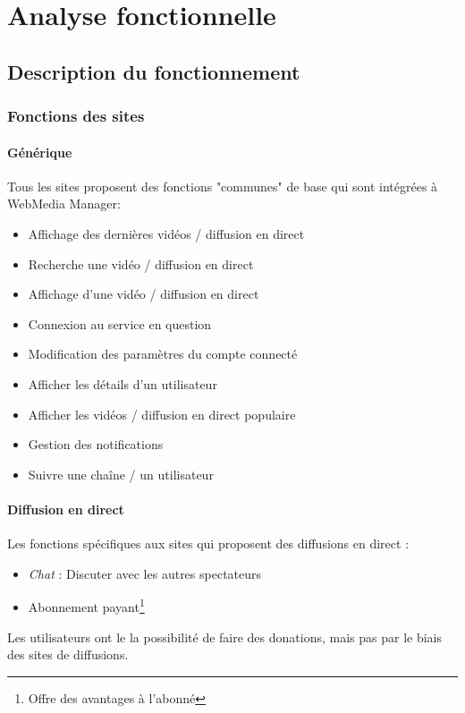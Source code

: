 \documentclass[11pt]{report} %
\begin{document}
		
\chapter{Analyse fonctionnelle}
	\section{Description du fonctionnement}
		\subsection{Fonctions des sites}
			\subsubsection{Générique}
			Tous les sites proposent des fonctions "communes" de base qui sont intégrées à WebMedia Manager:
			\begin{itemize}
				\item Affichage des dernières vidéos / diffusion en direct
				\item Recherche une vidéo / diffusion en direct
				\item Affichage d'une vidéo / diffusion en direct
				\item Connexion au service en question
				\item Modification des paramètres du compte connecté
				\item Afficher les détails d'un utilisateur
				\item Afficher les vidéos / diffusion en direct populaire
				\item Gestion des notifications
				\item Suivre une chaîne / un utilisateur
			\end{itemize}
			
			\subsubsection{Diffusion en direct}
			Les fonctions spécifiques aux sites qui proposent des diffusions en direct :
			\begin{itemize}
				\item \textit{Chat} : Discuter avec les autres spectateurs
				\item Abonnement payant\footnote{Offre des avantages à l'abonné}
			\end{itemize}
			Les utilisateurs ont le la possibilité de faire des donations, mais pas par le biais des sites de diffusions.
			
\end{document}
